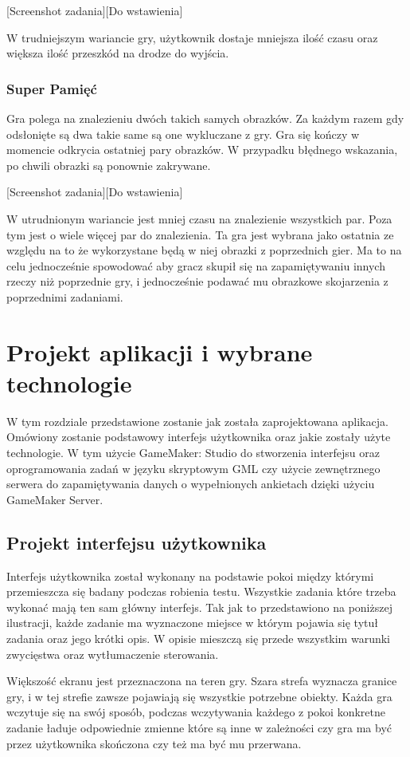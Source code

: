 \documentclass[openright]{xmgr}
\begin{document}
[Screenshot zadania][Do wstawienia]

W trudniejszym wariancie gry, użytkownik dostaje mniejsza ilość czasu oraz większa ilość przeszkód na drodze do wyjścia.  

\subsection{Super Pamięć}
Gra polega na znalezieniu dwóch takich samych obrazków. Za każdym razem gdy odsłonięte są dwa takie same są one wykluczane z gry. Gra się kończy w momencie odkrycia ostatniej pary obrazków. W przypadku błędnego wskazania, po chwili obrazki są ponownie zakrywane.

[Screenshot zadania][Do wstawienia]

W utrudnionym wariancie jest mniej czasu na znalezienie wszystkich par. Poza tym jest o wiele więcej par do znalezienia.
Ta gra jest wybrana jako ostatnia ze względu na to że wykorzystane będą w niej obrazki z poprzednich gier. Ma to na celu jednocześnie spowodować aby gracz skupił się na zapamiętywaniu innych rzeczy niż poprzednie gry, i jednocześnie podawać mu obrazkowe skojarzenia z poprzednimi zadaniami.

\chapter{Projekt aplikacji i wybrane technologie}
W tym rozdziale przedstawione zostanie jak została zaprojektowana aplikacja. Omówiony zostanie podstawowy interfejs użytkownika oraz jakie zostały użyte technologie. W tym użycie GameMaker: Studio do stworzenia interfejsu oraz oprogramowania zadań w języku skryptowym GML czy użycie zewnętrznego serwera do zapamiętywania danych o wypełnionych ankietach dzięki użyciu GameMaker Server.  

\section{Projekt interfejsu użytkownika}
Interfejs użytkownika został wykonany na podstawie pokoi między którymi przemieszcza się badany podczas robienia testu. Wszystkie zadania które trzeba wykonać mają ten sam główny interfejs. Tak jak to przedstawiono na poniższej ilustracji, każde zadanie ma wyznaczone miejsce w którym pojawia się tytuł zadania oraz jego krótki opis. W opisie mieszczą się przede wszystkim warunki zwycięstwa oraz wytłumaczenie sterowania.

Większość ekranu jest przeznaczona na teren gry. Szara strefa wyznacza granice gry, i w tej strefie zawsze pojawiają się wszystkie potrzebne obiekty. Każda gra wczytuje się na swój sposób, podczas wczytywania każdego z pokoi konkretne zadanie ładuje odpowiednie zmienne które są inne w zależności czy gra ma być przez użytkownika skończona czy też ma być mu przerwana.
\end{document}
